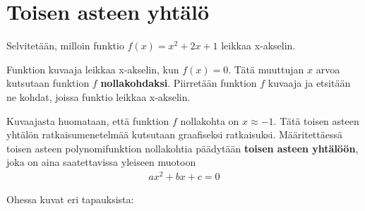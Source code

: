 \section{Toisen asteen yhtälö}


\begin{esimerkki}
Selvitetään, milloin funktio $f(x)=x^2+2x+1$ leikkaa x-akselin.

Funktion kuvaaja leikkaa x-akselin, kun $f(x)=0$. Tätä muuttujan $x$ arvoa kutsutaan funktion $f$ \textbf{nollakohdaksi}. Piirretään funktion $f$ kuvaaja ja etsitään ne kohdat, joissa funktio leikkaa x-akselin. %

\begin{kuvaajapohja}{1.5}{-2.5}{0.5}{-0.5}{3}
\end{kuvaajapohja}
\end{esimerkki}

Kuvaajasta huomataan, että funktion $f$ nollakohta on $x \approx -1$. Tätä toisen asteen yhtälön ratkaisumenetelmää kutsutaan graafiseksi ratkaisuksi.
Määritettäessä toisen asteen polynomifunktion nollakohtia päädytään \textbf{toisen asteen yhtälöön}, joka on aina saatettavissa yleiseen muotoon
\begin{align*}
ax^2+bx+c=0
\end{align*}

Ohessa kuvat eri tapauksista:

